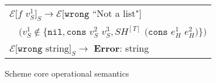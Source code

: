 \begin{figure}[p]
\begin{tabular}{l}
\vspace{5pt}

$\mathscr{E}[f$ $v_{S}^{1}]_{S}\rightarrow\mathscr{E}[\mathtt{wrong}$ ``Not a list"$]$ \\

\vspace{5pt}

$\quad(v_{S}^{1}\not\in\lbrace\mathtt{nil},\mathtt{cons}$ $v_{S}^{2}$ $v_{S}^{3},SH^{[T]}$ $(\mathtt{cons}$ $e_{H}^{1}$ $e_{H}^{2})\rbrace)$ \\

\vspace{5pt}

$\mathscr{E}[\mathtt{wrong}$ $\mathrm{string}]_{S}\rightarrow$ \textbf{Error}: string
\end{tabular}
\caption{Scheme core operational semantics}
\label{csos}
\end{figure}